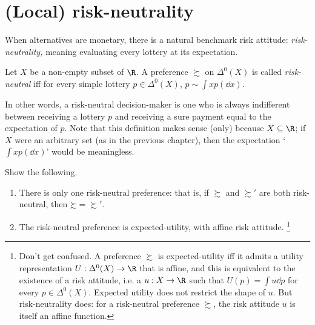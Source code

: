 \begin{exercise}
\begin{enumerate}[label=(\alph*)]
	\end{enumerate}
\end{exercise}



\section{(Local) risk-neutrality}
\label{mone:abs}

When alternatives are monetary, there is a natural benchmark risk attitude: \emph{risk-neutrality,} meaning evaluating every lottery at its expectation.

\begin{definition}
	\label{definition:risk_neutr}
	Let $X$ be a non-empty subset of $\R$. A preference $\succsim$ on $\Delta^0(X)$ is called \emph{risk-neutral} iff for every simple lottery $p \in \Delta^0(X)$, $p \sim \int x p(\dd x)$.
\end{definition}

In other words, a risk-neutral decision-maker is one who is always indifferent between receiving a lottery $p$ and receiving a sure payment equal to the expectation of $p$. Note that this definition makes sense (only) because $X \subseteq \R$; if $X$ were an arbitrary set (as in the previous chapter), then the expectation `$\int x p(\dd x)$' would be meaningless.

\begin{exercise}[easy]
	\label{exercise:risk_neutr_eu}
	Show the following.

	\begin{enumerate}[label=(\alph*)]
	
		\item There is only one risk-neutral preference: that is, if $\succsim$ and $\succsim'$ are both risk-neutral, then $\mathord{\succsim} = \mathord{\succsim'}$.

		\item The risk-neutral preference is expected-utility, with affine risk attitude.%
			\footnote{Don't get confused. A preference $\succsim$ is expected-utility iff it admits a utility representation $U : \Delta^0(X) \to \R$ that is affine, and this is equivalent to the existence of a risk attitude, i.e. a $u : X \to \R$ such that $U(p) = \int u \dd p$ for every $p \in \Delta^0(X)$. Expected utility does not restrict the shape of $u$. But risk-neutrality does: for a risk-neutral preference $\succsim$, the risk attitude $u$ is itself an affine function.}
	
	\end{enumerate}
\end{exercise}

